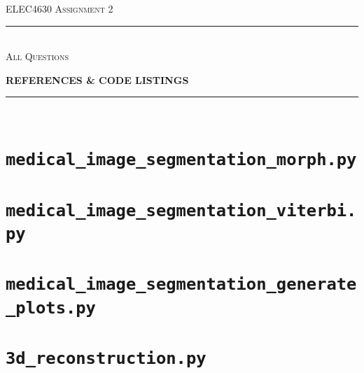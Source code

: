 \begin{titlepage}
  \centering

  \textsc{ELEC4630 Assignment 2}\\
  \vspace{9cm}

  \rule{\linewidth}{0.5pt}\\

  \vspace{1em}
  \LARGE\textsc{All Questions}\\
  \vspace{1em}

  \LARGE\uppercase{\textbf{{References \& Code Listings}}}\\

  \rule{\linewidth}{2pt}\\

  \vfill

\end{titlepage}

\printbibliography

\appendix

\newpage
\section{\texttt{medical\_image\_segmentation\_morph.py}}


\newpage
\section{\texttt{medical\_image\_segmentation\_viterbi.py}}


\newpage
\section{\texttt{medical\_image\_segmentation\_generate\_plots.py}}


\newpage
\section{\texttt{3d\_reconstruction.py}}


% 